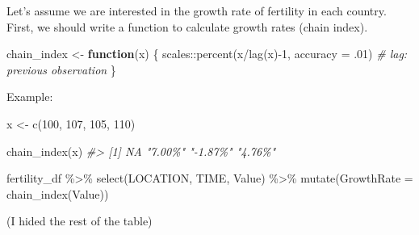 \documentclass[
]{article}
\newenvironment{Shaded}{\begin{snugshade}}{\end{snugshade}}
\newcommand{\AttributeTok}[1]{\textcolor[rgb]{0.77,0.63,0.00}{#1}}
\newcommand{\CommentTok}[1]{\textcolor[rgb]{0.56,0.35,0.01}{\textit{#1}}}
\newcommand{\ControlFlowTok}[1]{\textcolor[rgb]{0.13,0.29,0.53}{\textbf{#1}}}
\newcommand{\DecValTok}[1]{\textcolor[rgb]{0.00,0.00,0.81}{#1}}
\newcommand{\FunctionTok}[1]{\textcolor[rgb]{0.00,0.00,0.00}{#1}}
\newcommand{\NormalTok}[1]{#1}
\newcommand{\OtherTok}[1]{\textcolor[rgb]{0.56,0.35,0.01}{#1}}
\newcommand{\SpecialCharTok}[1]{\textcolor[rgb]{0.00,0.00,0.00}{#1}}
\begin{document}
Let's assume we are interested in the growth rate of fertility in each country. First, we should write a function to calculate growth rates (chain index).

\begin{Shaded}
\begin{Highlighting}[]
\NormalTok{chain\_index }\OtherTok{\textless{}{-}} \ControlFlowTok{function}\NormalTok{(x) \{}
\NormalTok{  scales}\SpecialCharTok{::}\FunctionTok{percent}\NormalTok{(x}\SpecialCharTok{/}\FunctionTok{lag}\NormalTok{(x)}\SpecialCharTok{{-}}\DecValTok{1}\NormalTok{, }\AttributeTok{accuracy =}\NormalTok{ .}\DecValTok{01}\NormalTok{)}
  \CommentTok{\# lag: previous observation}
\NormalTok{\}}
\end{Highlighting}
\end{Shaded}

Example:

\begin{Shaded}
\begin{Highlighting}[]
\NormalTok{x }\OtherTok{\textless{}{-}} \FunctionTok{c}\NormalTok{(}\DecValTok{100}\NormalTok{, }\DecValTok{107}\NormalTok{, }\DecValTok{105}\NormalTok{, }\DecValTok{110}\NormalTok{)}

\FunctionTok{chain\_index}\NormalTok{(x)}
\CommentTok{\#\textgreater{} [1] NA       "7.00\%"  "{-}1.87\%" "4.76\%"}
\end{Highlighting}
\end{Shaded}

\begin{Shaded}
\begin{Highlighting}[]
\NormalTok{fertility\_df }\SpecialCharTok{\%\textgreater{}\%} 
  \FunctionTok{select}\NormalTok{(LOCATION, TIME, Value) }\SpecialCharTok{\%\textgreater{}\%} 
  \FunctionTok{mutate}\NormalTok{(}\AttributeTok{GrowthRate =} \FunctionTok{chain\_index}\NormalTok{(Value))}
\end{Highlighting}
\end{Shaded}

(I hided the rest of the table)
\end{document}
